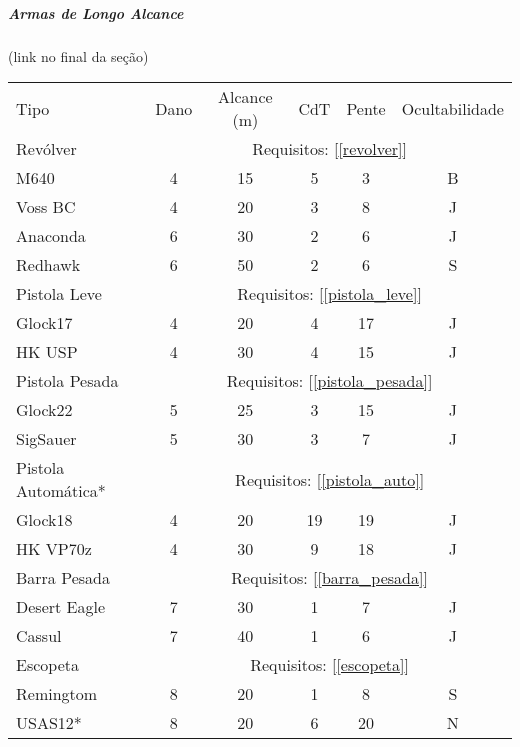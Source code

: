 \subparagraph{\bf Armas de Longo Alcance} (link no final da seção)

\begin{table}[!ht]
\centering
\label{Armas_alcance}
\begin{tabular}{|l c c c c c|}
\hline
Tipo 			&	Dano	&	Alcance (m)	&	CdT	&	Pente	&	Ocultabilidade \\

\rowcolor[HTML]{EFEFEF} 
Revólver		&	\multicolumn{5}{c|}{Requisitos: [\ref{revolver}]} \\
M640 			& 	4 		& 	15			& 5 	& 3		& B 	\\
Voss BC 		& 	4 		& 	20 			& 3 	& 8 	& J		\\
Anaconda 		& 	6 		& 	30			& 2 	& 6		& J 	\\
Redhawk 		& 	6 		& 	50 			& 2 	& 6		& S		\\

\rowcolor[HTML]{EFEFEF} 
Pistola	Leve	&	\multicolumn{5}{c|}{Requisitos: [\ref{pistola_leve}]} \\
Glock17 		& 4 		& 20 			& 4 	& 17 	& J	 	\\
HK USP 			& 4 		& 30 			& 4 	& 15 	& J 	\\

\rowcolor[HTML]{EFEFEF} 
Pistola	Pesada	&	\multicolumn{5}{c|}{Requisitos: [\ref{pistola_pesada}]} \\
Glock22 		& 5 		& 25 			& 3 	& 15 	& J	 	\\
SigSauer		& 5 		& 30 			& 3 	& 7 	& J 	\\

\rowcolor[HTML]{EFEFEF} 
Pistola	Automática*	&	\multicolumn{5}{c|}{Requisitos: [\ref{pistola_auto}]} \\
Glock18 		& 4 		& 20 			& 19 	& 19 	& J	 	\\
HK VP70z		& 4 		& 30 			& 9 	& 18 	& J 	\\

\rowcolor[HTML]{EFEFEF} 
Barra Pesada	&	\multicolumn{5}{c|}{Requisitos: [\ref{barra_pesada}]} \\
Desert Eagle 	& 7 		& 30 			& 1 	& 7 	& J	 	\\
Cassul			& 7 		& 40 			& 1 	& 6 	& J 	\\

\rowcolor[HTML]{EFEFEF} 
Escopeta		&	\multicolumn{5}{c|}{Requisitos: [\ref{escopeta}]} \\
Remingtom		& 8 		& 20 			& 1 	& 8 	& S 	\\
USAS12*			& 8 		& 20 			& 6 	& 20 	& N 	\\


\end{tabular}
\end{table}
